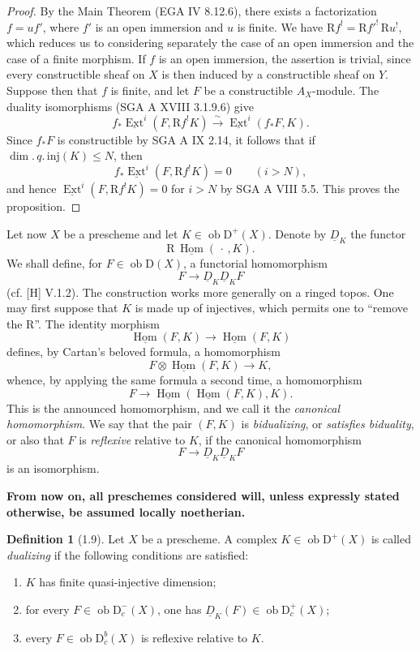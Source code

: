 \documentclass[11pt,a4paper]{article}
\newcommand{\D}{\mathrm{D}}
\newcommand{\ob}{\operatorname{ob}}
\DeclareMathOperator{\Hom}{Hom}
\DeclareMathOperator{\Ext}{Ext}
\newcommand{\uHom}{\underline{\Hom}}
\newcommand{\uExt}{\underline{\Ext}}
\newcommand{\RHom}{\mathrm{R}\,\underline{\Hom}}
\newcommand{\Ddual}{\underline{D}}
\newcommand{\qinjdim}{\dim.\,q.\,\mathrm{inj}}
\theoremstyle{plain}
\theoremstyle{definition}
\newtheorem*{definitionstar}{Definition}
\begin{document}
\begin{proof}
By the Main Theorem (EGA IV 8.12.6), there exists a factorization $f=uf'$, where $f'$ is an open immersion and $u$ is finite. We have $\mathrm{R}f^!=\mathrm{R}f'^!\,\mathrm{R}u^!$, which reduces us to considering separately the case of an open immersion and the case of a finite morphism. If $f$ is an open immersion, the assertion is trivial, since every constructible sheaf on $X$ is then induced by a constructible sheaf on $Y$. Suppose then that $f$ is finite, and let $F$ be a constructible $A_X$-module. The duality isomorphisms (SGA A XVIII 3.1.9.6) give
\[
f_*\uExt^i(F,\mathrm{R}f^!K)\xrightarrow{\sim}\uExt^i(f_*F,K).
\]
Since $f_*F$ is constructible by SGA A IX 2.14, it follows that if $\qinjdim(K)\leq N$, then
\[
f_*\uExt^i(F,\mathrm{R}f^!K)=0\qquad(i>N),
\]
and hence $\uExt^i(F,\mathrm{R}f^!K)=0$ for $i>N$ by SGA A VIII 5.5. This proves the proposition.
\end{proof}

Let now $X$ be a prescheme and let $K\in\ob\D^+(X)$. Denote by $\Ddual_K$ the functor
\[
\RHom(\,\cdot\,,K).
\]
We shall define, for $F\in\ob\D(X)$, a functorial homomorphism
\[
F\longrightarrow \Ddual_K\Ddual_KF
\]
(cf. [H] V.1.2). The construction works more generally on a ringed topos. One may first suppose that $K$ is made up of injectives, which permits one to ``remove the $\mathrm R$''. The identity morphism
\[
\uHom(F,K)\longrightarrow \uHom(F,K)
\]
defines, by Cartan's beloved formula, a homomorphism
\[
F\otimes\uHom(F,K)\longrightarrow K,
\]
whence, by applying the same formula a second time, a homomorphism
\[
F\longrightarrow \uHom(\uHom(F,K),K).
\]
This is the announced homomorphism, and we call it the \emph{canonical homomorphism}. We say that the pair $(F,K)$ is \emph{bidualizing}, or \emph{satisfies biduality}, or also that $F$ is \emph{reflexive} relative to $K$, if the canonical homomorphism
\[
F\longrightarrow \Ddual_K\Ddual_KF
\]
is an isomorphism.

\medskip
\noindent\textbf{From now on, all preschemes considered will, unless expressly stated otherwise, be assumed locally noetherian.}

\begin{definitionstar}[1.9]
Let $X$ be a prescheme. A complex $K\in\ob\D^+(X)$ is called \emph{dualizing} if the following conditions are satisfied:
\begin{enumerate}[label=(\roman*)]
\item $K$ has finite quasi-injective dimension;
\item for every $F\in\ob\D_c^-(X)$, one has $\Ddual_K(F)\in\ob\D_c^+(X)$;
\item every $F\in\ob\D_c^b(X)$ is reflexive relative to $K$.
\end{enumerate}
\end{definitionstar}
\end{document}
